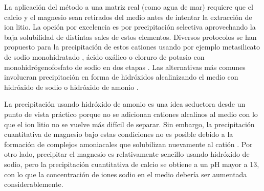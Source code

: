
La aplicación del método a una matriz real (como agua de mar) requiere que el calcio y el magnesio sean retirados del medio antes de intentar la extracción de ion litio. La opción por excelencia es por precipitación selectiva aprovechando la baja solubilidad de distintas sales de estos elementos. Diversos protocolos se han propuesto para la precipitación de estos cationes usando por ejemplo metasilicato de sodio monohidratado \citep{Zhang2019}, ácido oxálico \citep{TRAN2015} o cloruro de potasio con monohidrógenofosfato de sodio en dos etapas \citep{Lai2020}. Las alternativas más comunes involucran precipitación en forma de hidróxidos alcalinizando el medio con hidróxido de sodio \citep{ALAMDARI2008} o hidróxido de amonio \citep{Harvianto2016}. 

La precipitación usando hidróxido de amonio es una idea seductora desde un punto de vista práctico porque no se adicionan cationes alcalinos al medio con lo que el ion litio no se vuelve más difícil de separar. Sin embargo, la precipitación cuantitativa de magnesio bajo estas condiciones no es posible debido a la formación de complejos amoniacales que solubilizan nuevamente al catión \citep{Yamagata2011}. Por otro lado, precipitar el magnesio es relativamente sencillo usando hidróxido de sodio, pero la precipitación cuantitativa de calcio se obtiene a un pH mayor a 13, con lo que la concentración de iones sodio en el medio debería ser aumentada considerablemente. 

